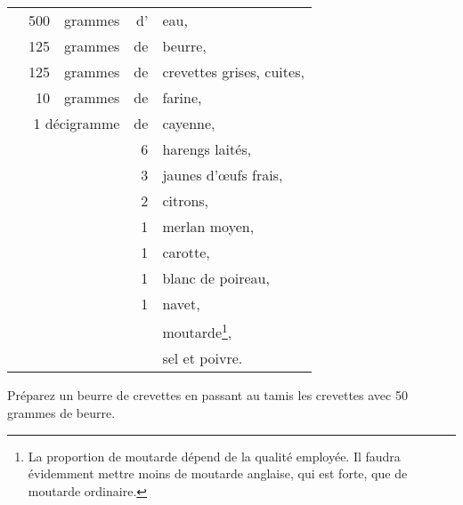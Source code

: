 \footnotesize
\begin{longtable}{rrrrp{16em}}
  & 500 & grammes    & d’ & eau,                                                                          \\
  & 125 & grammes    & de & beurre,                                                                       \\
  & 125 & grammes    & de & crevettes grises, cuites,                                                     \\
  &  10 & grammes    & de & farine,                                                                       \\
  & \multicolumn{2}{r}{1 décigramme}  & de & cayenne,                                                     \\
  &     &            &  6 & harengs laités,                                                               \\
  &     &            &  3 & jaunes d'œufs frais,                                                          \\
  &     &            &  2 & citrons,                                                                      \\
  &     &            &  1 & merlan moyen,                                                                 \\
  &     &            &  1 & carotte,                                                                      \\
  &     &            &  1 & blanc de poireau,                                                             \\
  &     &            &  1 & navet,                                                                        \\
  &     &            &    & moutarde\footnote{La proportion de moutarde dépend
                                           de la qualité employée. Il faudra
                                           évidemment mettre moins de moutarde
                                           anglaise, qui est forte, que de
                                           moutarde ordinaire.},                                         \\
  &     &            &    & sel et poivre.                                                               \\
\end{longtable}
\normalsize

Préparez un beurre de crevettes en passant au tamis les crevettes avec 50
grammes de beurre.

